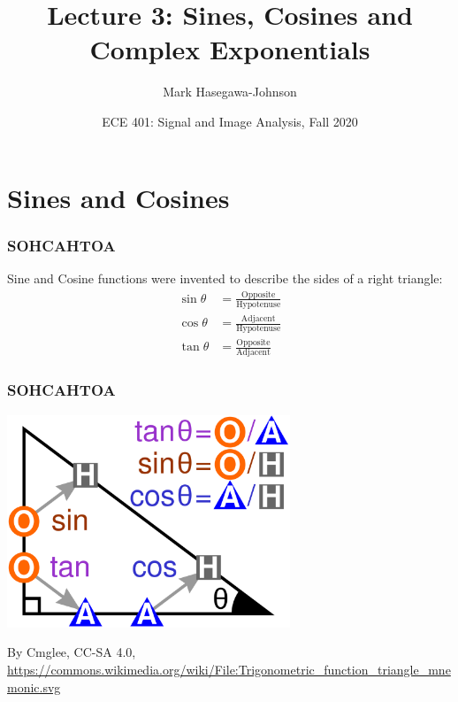 \documentclass{beamer}
\title{Lecture 3: Sines, Cosines and Complex Exponentials}
\author{Mark Hasegawa-Johnson}
\date{ECE 401: Signal and Image Analysis, Fall 2020}
\begin{document}
\begin{frame}
  \maketitle
\end{frame}

\begin{frame}
  \tableofcontents
\end{frame}

\section[Cosines]{Sines and Cosines}
\setcounter{subsection}{1}

\begin{frame}
  \frametitle{SOHCAHTOA}

  Sine and Cosine functions were invented to describe the sides of a right triangle:
  \begin{align*}
    \sin\theta &= \frac{\mbox{Opposite}}{\mbox{Hypotenuse}}\\
    \cos\theta &= \frac{\mbox{Adjacent}}{\mbox{Hypotenuse}}\\
    \tan\theta &= \frac{\mbox{Opposite}}{\mbox{Adjacent}}
  \end{align*}
\end{frame}

\begin{frame}
  \frametitle{SOHCAHTOA}

  \centerline{\includegraphics[height=2.5in]{sohcahtoa.png}}
  \begin{tiny}
    By Cmglee, CC-SA 4.0,
    \url{https://commons.wikimedia.org/wiki/File:Trigonometric_function_triangle_mnemonic.svg}
  \end{tiny}
\end{frame}
\end{document}

